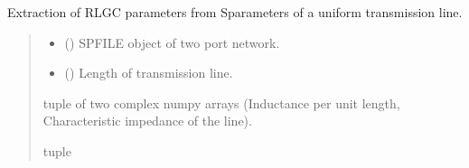 \documentclass[letterpaper,10pt,english]{sphinxmanual}
\begin{document}
\begin{fulllineitems}
\label{\detokenize{touchstone:touchstone.extract_rlgc}}
\pysigstartsignatures
{}
\pysigstopsignatures
\sphinxAtStartPar
Extraction of RLGC parameters from S\sphinxhyphen{}parameters of a uniform transmission line.
\begin{quote}\begin{description}
\begin{itemize}
\item {} 
\sphinxAtStartPar
{} () \textendash{} SPFILE object of two port network.

\item {} 
\sphinxAtStartPar
{} () \textendash{} Length of transmission line.

\end{itemize}

\sphinxAtStartPar
tuple of two complex numpy arrays (Inductance per unit length, Characteristic impedance of the line).

\sphinxAtStartPar
tuple

\end{description}\end{quote}

\end{fulllineitems}

\end{document}
